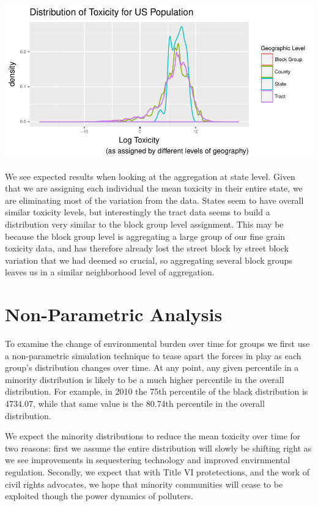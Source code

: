 \documentclass[12pt,twoside]{dukestatscithesis}
\theoremstyle{definition}
\theoremstyle{definition}
\theoremstyle{definition}
\theoremstyle{remark}
\begin{document}
\includegraphics{thesis_files/figure-latex/unnamed-chunk-1-1.pdf}

We see expected results when looking at the aggregation at state level.
Given that we are assigning each individual the mean toxicity in their
entire state, we are eliminating most of the variation from the data.
States seem to have overall similar toxicity levels, but interestingly
the tract data seems to build a distribution very similar to the block
group level assignment. This may be because the block group level is
aggregating a large group of our fine grain toxicity data, and has
therefore already lost the street block by street block variation that
we had deemed so crucial, so aggregating several block groups leaves us
in a similar neighborhood level of aggregation.

\section{Non-Parametric Analysis}\label{non-parametric-analysis}

To examine the change of environmental burden over time for groups we
first use a non-parametric simulation technique to tease apart the
forces in play as each group's distribution changes over time. At any
point, any given percentile in a minority distribution is likely to be a
much higher percentile in the overall distribution. For example, in 2010
the 75th percentile of the black distribution is 4734.07, while that
same value is the 80.74th percentile in the overall distribution.

We expect the minority distributions to reduce the mean toxicity over
time for two reasons: first we assume the entire distribution will
slowly be shifting right as we see improvements in sequestering
technology and improved envirnmental regulation. Secondly, we expect
that with Title VI protetections, and the work of civil rights
advocates, we hope that minority communities will cease to be exploited
though the power dynamics of polluters.
\end{document}
